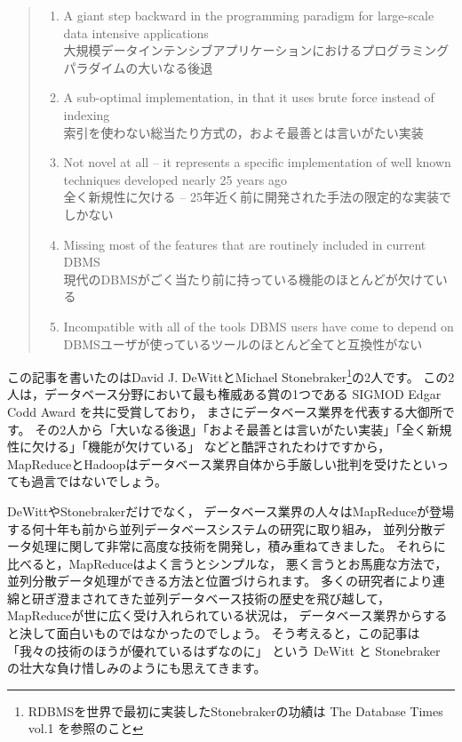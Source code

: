 \begin{quote}
\begin{enumerate}
 \item A giant step backward in the programming paradigm for large-scale data intensive applications \\
	   大規模データインテンシブアプリケーションにおけるプログラミングパラダイムの大いなる後退
 \item A sub-optimal implementation, in that it uses brute force instead of indexing \\
	   索引を使わない総当たり方式の，およそ最善とは言いがたい実装
 \item Not novel at all -- it represents a specific implementation of well known techniques developed nearly 25 years ago \\
	   全く新規性に欠ける -- 25年近く前に開発された手法の限定的な実装でしかない
 \item Missing most of the features that are routinely included in current DBMS \\
	   現代のDBMSがごく当たり前に持っている機能のほとんどが欠けている
 \item Incompatible with all of the tools DBMS users have come to depend on \\
	   DBMSユーザが使っているツールのほとんど全てと互換性がない
\end{enumerate}
\end{quote}

この記事を書いたのはDavid J. DeWittとMichael Stonebraker\footnote{RDBMSを世界で最初に実装したStonebrakerの功績は The Database Times vol.1 を参照のこと}の2人です。
この2人は，データベース分野において最も権威ある賞の1つである SIGMOD Edgar Codd Award を共に受賞しており，
まさにデータベース業界を代表する大御所です。
その2人から「大いなる後退」「およそ最善とは言いがたい実装」「全く新規性に欠ける」「機能が欠けている」
などと酷評されたわけですから，
MapReduceとHadoopはデータベース業界自体から手厳しい批判を受けたといっても過言ではないでしょう。

DeWittやStonebrakerだけでなく，
データベース業界の人々はMapReduceが登場する何十年も前から並列データベースシステムの研究に取り組み，
並列分散データ処理に関して非常に高度な技術を開発し，積み重ねてきました。
それらに比べると，MapReduceはよく言うとシンプルな，
悪く言うとお馬鹿な方法で，並列分散データ処理ができる方法と位置づけられます。
多くの研究者により連綿と研ぎ澄まされてきた並列データベース技術の歴史を飛び越して，
MapReduceが世に広く受け入れられている状況は，
データベース業界からすると決して面白いものではなかったのでしょう。
そう考えると，この記事は「我々の技術のほうが優れているはずなのに」
という DeWitt と Stonebraker の壮大な負け惜しみのようにも思えてきます。

